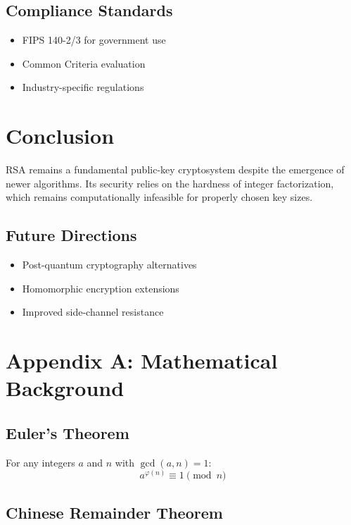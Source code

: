 	\subsection{Compliance Standards}
	
	\begin{itemize}
		\item FIPS 140-2/3 for government use
		\item Common Criteria evaluation
		\item Industry-specific regulations
	\end{itemize}
	
	\section{Conclusion}
	
	RSA remains a fundamental public-key cryptosystem despite the emergence of newer algorithms. Its security relies on the hardness of integer factorization, which remains computationally infeasible for properly chosen key sizes.
	
	\subsection{Future Directions}
	
	\begin{itemize}
		\item Post-quantum cryptography alternatives
		\item Homomorphic encryption extensions
		\item Improved side-channel resistance
	\end{itemize}
	
	\appendix
	
	\section{Appendix A: Mathematical Background}
	
	\subsection{Euler's Theorem}
	
	For any integers $a$ and $n$ with $\gcd(a, n) = 1$:
	\[
	a^{\varphi(n)} \equiv 1 \pmod{n}
	\]
	
	\subsection{Chinese Remainder Theorem}
	
